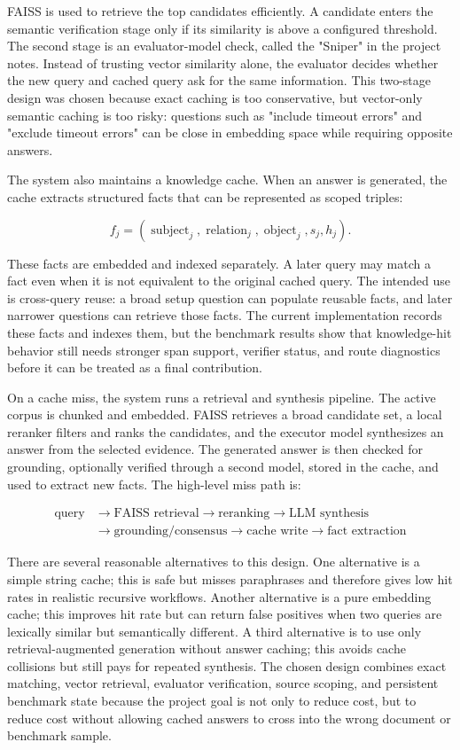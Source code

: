 \documentclass[10pt,a4paper]{article}
\begin{document}
FAISS is used to retrieve the top candidates efficiently. A candidate enters the semantic verification stage only if its similarity is above a configured threshold. The second stage is an evaluator-model check, called the "Sniper" in the project notes. Instead of trusting vector similarity alone, the evaluator decides whether the new query and cached query ask for the same information. This two-stage design was chosen because exact caching is too conservative, but vector-only semantic caching is too risky: questions such as "include timeout errors" and "exclude timeout errors" can be close in embedding space while requiring opposite answers.

The system also maintains a knowledge cache. When an answer is generated, the cache extracts structured facts that can be represented as scoped triples:

\[
f_j = (\operatorname{subject}_j, \operatorname{relation}_j, \operatorname{object}_j, s_j, h_j).
\]

These facts are embedded and indexed separately. A later query may match a fact even when it is not equivalent to the original cached query. The intended use is cross-query reuse: a broad setup question can populate reusable facts, and later narrower questions can retrieve those facts. The current implementation records these facts and indexes them, but the benchmark results show that knowledge-hit behavior still needs stronger span support, verifier status, and route diagnostics before it can be treated as a final contribution.

On a cache miss, the system runs a retrieval and synthesis pipeline. The active corpus is chunked and embedded. FAISS retrieves a broad candidate set, a local reranker filters and ranks the candidates, and the executor model synthesizes an answer from the selected evidence. The generated answer is then checked for grounding, optionally verified through a second model, stored in the cache, and used to extract new facts. The high-level miss path is:

\[
\begin{aligned}
\text{query} &\to \text{FAISS retrieval} \to \text{reranking} \to \text{LLM synthesis}\\
&\to \text{grounding/consensus} \to \text{cache write} \to \text{fact extraction}
\end{aligned}
\]

There are several reasonable alternatives to this design. One alternative is a simple string cache; this is safe but misses paraphrases and therefore gives low hit rates in realistic recursive workflows. Another alternative is a pure embedding cache; this improves hit rate but can return false positives when two queries are lexically similar but semantically different. A third alternative is to use only retrieval-augmented generation without answer caching; this avoids cache collisions but still pays for repeated synthesis. The chosen design combines exact matching, vector retrieval, evaluator verification, source scoping, and persistent benchmark state because the project goal is not only to reduce cost, but to reduce cost without allowing cached answers to cross into the wrong document or benchmark sample.
\end{document}
